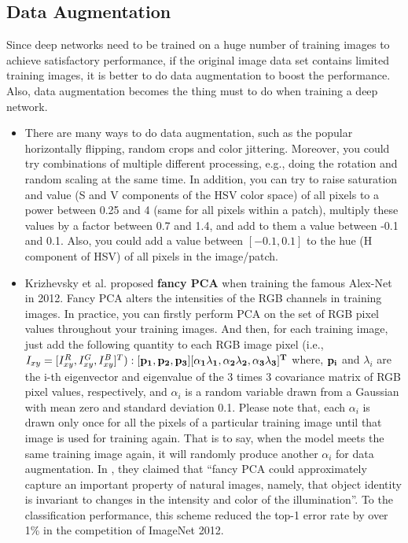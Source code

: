 \documentclass[11pt,fleqn, UTF8]{ctexbook} %
\begin{document}
\subsection{Data Augmentation}
Since deep networks need to be trained on a huge number of training images to achieve satisfactory performance, if the original image data set contains limited training images, it is better to do data augmentation to boost the performance. Also, data augmentation becomes the thing must to do when training a deep network.
\begin{itemize}
  \item There are many ways to do data augmentation, such as the popular horizontally flipping, random crops and color jittering. Moreover, you could try combinations of multiple different processing, e.g., doing the rotation and random scaling at the same time. In addition, you can try to raise saturation and value (S and V components of the HSV color space) of all pixels to a power between 0.25 and 4 (same for all pixels within a patch), multiply these values by a factor between 0.7 and 1.4, and add to them a value between -0.1 and 0.1. Also, you could add a value between $[-0.1, 0.1]$ to the hue (H component of HSV) of all pixels in the image/patch.
  \item Krizhevsky et al. \cite{krizhevsky2012imagenet} proposed \textbf{fancy PCA} when training the famous Alex-Net in 2012. Fancy PCA alters the intensities of the RGB channels in training images. In practice, you can firstly perform PCA on the set of RGB pixel values throughout your training images. And then, for each training image, just add the following quantity to each RGB image pixel (i.e., $I_{xy}=[I_{xy}^R,I_{xy}^G,I_{xy}^B]^T): [\bf{p}_1,\bf{p}_2,\bf{p}_3][\alpha_1 \lambda_1,\alpha_2 \lambda_2,\alpha_3 \lambda_3]^T$ where, $\bf{p}_i$ and $\lambda_i$ are the i-th eigenvector and eigenvalue of the 3 times 3 covariance matrix of RGB pixel values, respectively, and $\alpha_i$ is a random variable drawn from a Gaussian with mean zero and standard deviation 0.1. Please note that, each $\alpha_i$ is drawn only once for all the pixels of a particular training image until that image is used for training again. That is to say, when the model meets the same training image again, it will randomly produce another $\alpha_i$ for data augmentation. In \cite{krizhevsky2012imagenet}, they claimed that “fancy PCA could approximately capture an important property of natural images, namely, that object identity is invariant to changes in the intensity and color of the illumination”. To the classification performance, this scheme reduced the top-1 error rate by over 1\% in the competition of ImageNet 2012.
\end{itemize}
\end{document}
